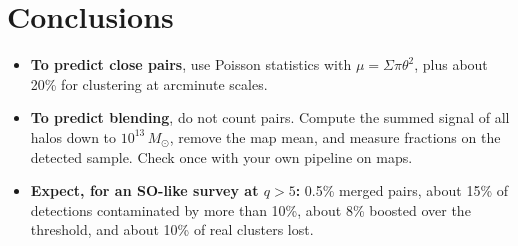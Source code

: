 \documentclass[10pt]{article}
\begin{document}
\section{Conclusions}
\begin{itemize}
\item \textbf{To predict close pairs}, use Poisson statistics with $\mu=\Sigma\pi\theta^2$, plus about 20\% for clustering at arcminute scales.
\item \textbf{To predict blending}, do not count pairs. Compute the summed signal of all halos down to $10^{13}\,M_\odot$, remove the map mean, and measure fractions on the detected sample. Check once with your own pipeline on maps.
\item \textbf{Expect, for an SO-like survey at $q>5$:} 0.5\% merged pairs, about 15\% of detections contaminated by more than 10\%, about 8\% boosted over the threshold, and about 10\% of real clusters lost.
\end{itemize}
\end{document}

